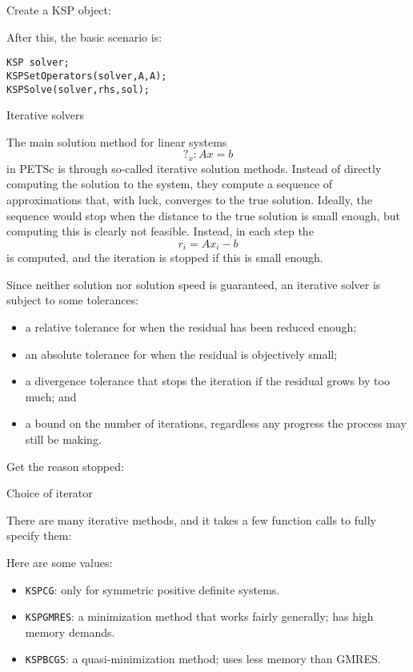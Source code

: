 Create a KSP object:
%

After this, the basic scenario is:
\begin{lstlisting}
KSP solver;
KSPSetOperators(solver,A,A);
KSPSolve(solver,rhs,sol);
\end{lstlisting}

 {Iterative solvers}

The main solution method for linear systems
\[ ?_x\colon Ax=b \]
in PETSc is through
so-called iterative solution methods. Instead of directly computing
the solution to the system, they compute a sequence of approximations
that, with luck, converges to the true solution. Ideally, the sequence
would stop when the distance to the true solution is small enough, but
computing this is clearly not feasible. Instead, in each step the
\[ r_i=Ax_i-b \]
is computed, and the iteration is stopped if this is small enough.

Since neither
solution nor solution speed is guaranteed, an iterative solver is
subject to some tolerances:
\begin{itemize}
\item a relative tolerance for when the residual has been reduced
  enough;
\item an absolute tolerance for when the residual is objectively
  small;
\item a divergence tolerance that stops the iteration if the residual
  grows by too much; and
\item a bound on the number of iterations, regardless any progress the
  process may still be making.
\end{itemize}


Get the reason  stopped:
%

 {Choice of iterator}

There are many iterative methods, and it takes a few function calls to fully specify them:


Here are some values:
\begin{itemize}
\item \lstinline{KSPCG}: only for symmetric positive definite systems.
\item \lstinline{KSPGMRES}: a minimization method that works fairly
  generally; has high memory demands.
\item \lstinline{KSPBCGS}: a quasi-minimization method; uses less memory than GMRES.
\end{itemize}

